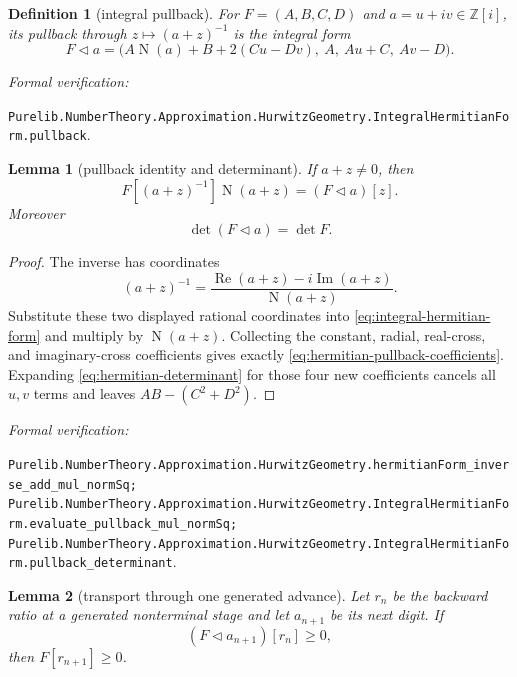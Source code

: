 \documentclass[11pt]{article}
\newtheorem{lemma}[lemma]{Lemma}
\newtheorem{definition}[definition]{Definition}
\newcommand{\Zi}{\mathbb{Z}[i]}
\newcommand{\Norm}[1]{\operatorname{N}\!\left(#1\right)}
\newcommand{\leanref}[1]{\par\smallskip\noindent
  \emph{Formal verification:}\par\nobreak
  {\raggedright\nolinkurl{#1}.\par}}
\begin{document}
\begin{definition}[integral pullback]
\label{def:hermitian-pullback}
For $F=(A,B,C,D)$ and $a=u+iv\in\Zi$, its pullback through
$z\mapsto(a+z)^{-1}$ is the integral form
\begin{equation}
\label{eq:hermitian-pullback-coefficients}
 F\mathbin{\triangleleft}a=
 \bigl(A\Norm a+B+2(Cu-Dv),\ A,\ Au+C,\ Av-D\bigr).
\end{equation}
\end{definition}

\leanref{Purelib.NumberTheory.Approximation.HurwitzGeometry.IntegralHermitianForm.pullback}

\begin{lemma}[pullback identity and determinant]
\label{lem:hermitian-pullback}
If $a+z\ne0$, then
\begin{equation}
\label{eq:hermitian-pullback}
 F[(a+z)^{-1}]\Norm{a+z}=(F\mathbin{\triangleleft}a)[z].
\end{equation}
Moreover
\begin{equation}
\label{eq:pullback-determinant}
                 \det(F\mathbin{\triangleleft}a)=\det F.
\end{equation}
\end{lemma}

\begin{proof}
The inverse has coordinates
\[
 (a+z)^{-1}
 =\frac{\operatorname{Re}(a+z)-i\operatorname{Im}(a+z)}{\Norm{a+z}}.
\]
Substitute these two displayed rational coordinates into
\eqref{eq:integral-hermitian-form} and multiply by $\Norm{a+z}$.  Collecting
the constant, radial, real-cross, and imaginary-cross coefficients gives
exactly \eqref{eq:hermitian-pullback-coefficients}.  Expanding
\eqref{eq:hermitian-determinant} for those four new coefficients cancels all
$u,v$ terms and leaves $AB-(C^2+D^2)$.
\end{proof}

\leanref{Purelib.NumberTheory.Approximation.HurwitzGeometry.hermitianForm_inverse_add_mul_normSq;
Purelib.NumberTheory.Approximation.HurwitzGeometry.IntegralHermitianForm.evaluate_pullback_mul_normSq;
Purelib.NumberTheory.Approximation.HurwitzGeometry.IntegralHermitianForm.pullback_determinant}

\begin{lemma}[transport through one generated advance]
\label{lem:hermitian-transport}
Let $r_n$ be the backward ratio at a generated nonterminal stage and let
$a_{n+1}$ be its next digit.  If
\[
               (F\mathbin{\triangleleft}a_{n+1})[r_n]\ge0,
\]
then $F[r_{n+1}]\ge0$.
\end{lemma}
\end{document}
